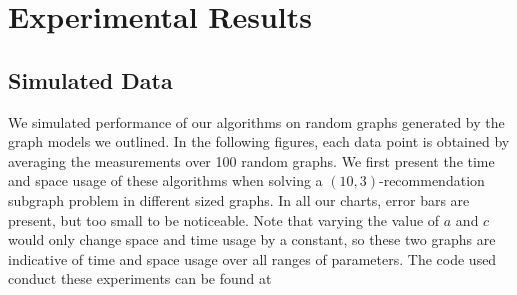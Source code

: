 \section{Experimental Results}

\subsection{Simulated Data}
We simulated performance of our algorithms on random graphs generated
by the graph models we outlined. 
In the following figures, each data
point is obtained by averaging the measurements over 100 random
graphs. We first present the time and space usage of these algorithms when
solving a $(10,3)$-recommendation subgraph problem in different sized graphs.
In all our charts, error bars are present, but too small to be noticeable.
Note that varying the value of $a$ and $c$ would only change space and time
usage by a constant, so these two graphs are indicative of time and space
usage over all ranges of parameters. The code used conduct these experiments 
can be found at %

